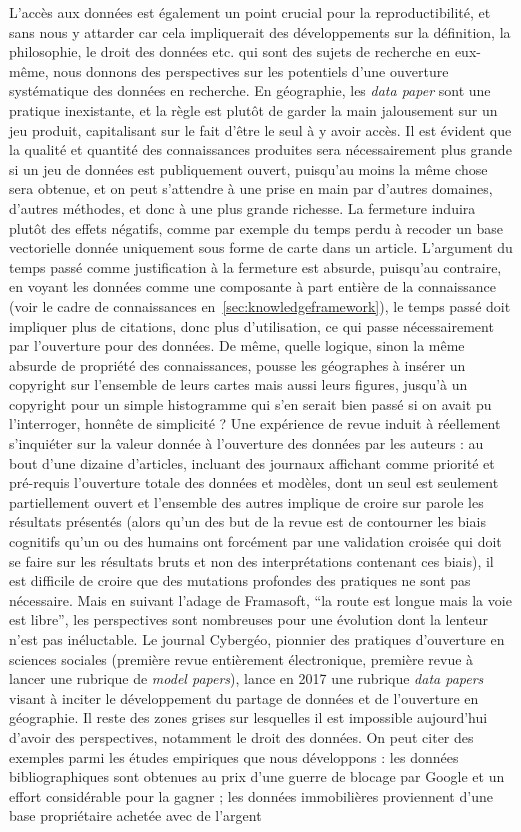 L'accès aux données est également un point crucial pour la reproductibilité, et sans nous y attarder car cela impliquerait des développements sur la définition, la philosophie, le droit des données etc. qui sont des sujets de recherche en eux-même, nous donnons des perspectives sur les potentiels d'une ouverture systématique des données en recherche. En géographie, les \emph{data paper} sont une pratique inexistante, et la règle est plutôt de garder la main jalousement sur un jeu produit, capitalisant sur le fait d'être le seul à y avoir accès. Il est évident que la qualité et quantité des connaissances produites sera nécessairement plus grande si un jeu de données est publiquement ouvert, puisqu'au moins la même chose sera obtenue, et on peut s'attendre à une prise en main par d'autres domaines, d'autres méthodes, et donc à une plus grande richesse. La fermeture induira plutôt des effets négatifs, comme par exemple du temps perdu à recoder un base vectorielle donnée uniquement sous forme de carte dans un article. L'argument du temps passé comme justification à la fermeture est absurde, puisqu'au contraire, en voyant les données comme une composante à part entière de la connaissance (voir le cadre de connaissances en~\ref{sec:knowledgeframework}), le temps passé doit impliquer plus de citations, donc plus d'utilisation, ce qui passe nécessairement par l'ouverture pour des données. De même, quelle logique, sinon la même absurde de propriété des connaissances, pousse les géographes à insérer un copyright sur l'ensemble de leurs cartes mais aussi leurs figures, jusqu'à un copyright pour un simple histogramme qui s'en serait bien passé si on avait pu l'interroger, honnête de simplicité ? Une expérience de revue induit à réellement s'inquiéter sur la valeur donnée à l'ouverture des données par les auteurs : au bout d'une dizaine d'articles, incluant des journaux affichant comme priorité et pré-requis l'ouverture totale des données et modèles, dont un seul est seulement partiellement ouvert et l'ensemble des autres implique de croire sur parole les résultats présentés (alors qu'un des but de la revue est de contourner les biais cognitifs qu'un ou des humains ont forcément par une validation croisée qui doit se faire sur les résultats bruts et non des interprétations contenant ces biais), il est difficile de croire que des mutations profondes des pratiques ne sont pas nécessaire. Mais en suivant l'adage de Framasoft, ``la route est longue mais la voie est libre'', les perspectives sont nombreuses pour une évolution dont la lenteur n'est pas inéluctable. Le journal Cybergéo, pionnier des pratiques d'ouverture en sciences sociales (première revue entièrement électronique, première revue à lancer une rubrique de \emph{model papers}), lance en 2017 une rubrique \emph{data papers} visant à inciter le développement du partage de données et de l'ouverture en géographie. Il reste des zones grises sur lesquelles il est impossible aujourd'hui d'avoir des perspectives, notamment le droit des données. On peut citer des exemples parmi les études empiriques que nous développons : les données bibliographiques sont obtenues au prix d'une guerre de blocage par Google et un effort considérable pour la gagner ; les données immobilières proviennent d'une base propriétaire achetée avec de l'argent 